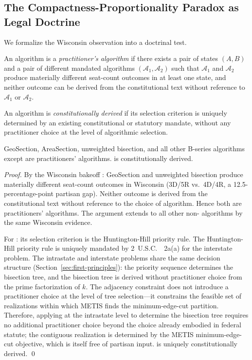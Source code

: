 \subsection{The Compactness-Proportionality Paradox as Legal Doctrine}

We formalize the Wisconsin observation into a doctrinal test.

\begin{definition}
An algorithm is a \emph{practitioner's algorithm} if there exists a
pair of states $(A, B)$ and a pair of different mandated algorithms
$(\mathcal{A}_1, \mathcal{A}_2)$ such that $\mathcal{A}_1$ and $\mathcal{A}_2$
produce materially different seat-count outcomes in at least one state,
and neither outcome can be derived from the constitutional text without
reference to $\mathcal{A}_1$ or $\mathcal{A}_2$.
\end{definition}

\begin{definition}
An algorithm is \emph{constitutionally derived} if its selection criterion
is uniquely determined by an existing constitutional or statutory mandate,
without any practitioner choice at the level of algorithmic selection.
\end{definition}

\begin{proposition}
GeoSection, AreaSection, unweighted bisection, and all other B-series
algorithms except \ar{} are practitioners' algorithms.
\ar{} is constitutionally derived.
\end{proposition}

\begin{proof}
By the Wisconsin bakeoff \citep{b0paper}: GeoSection and unweighted bisection
produce materially different seat-count outcomes in Wisconsin
(3D/5R vs.\ 4D/4R, a 12.5-percentage-point partisan gap).
Neither outcome is derived from the constitutional text without reference
to the choice of algorithm.
Hence both are practitioners' algorithms.
The argument extends to all other non-\ar{} algorithms by the same
Wisconsin evidence.

For \ar{}: its selection criterion is the Huntington-Hill priority rule.
The Huntington-Hill priority rule is uniquely mandated by 2~U.S.C.~\usca{}~2a(a)
for the interstate problem.
The intrastate and interstate problems share the same decision structure
(Section~\ref{sec:first-principles}): the \hh{} priority sequence determines
the bisection tree, and the bisection tree is derived without practitioner choice
from the prime factorization of $k$.
The adjacency constraint does not introduce a practitioner choice at the level
of tree selection---it constrains the feasible set of realizations within which
METIS finds the minimum-edge-cut partition.
Therefore, applying \hh{} at the intrastate level to determine the bisection tree
requires no additional practitioner choice beyond the choice already embodied in
federal statute; the contiguous realization is determined by the METIS minimum-edge-cut
objective, which is itself free of partisan input.
\ar{} is uniquely constitutionally derived.
\qed
\end{proof}

